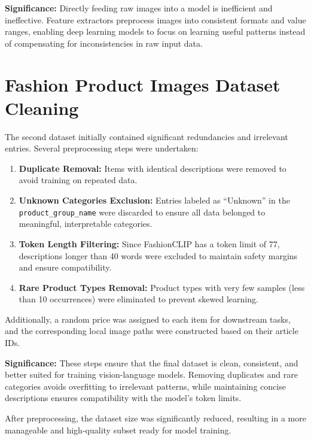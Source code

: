 \textbf{Significance:} Directly feeding raw images into a model is inefficient and ineffective. Feature extractors preprocess images into consistent formats and value ranges, enabling deep learning models to focus on learning useful patterns instead of compensating for inconsistencies in raw input data.

\section{Fashion Product Images Dataset Cleaning}

The second dataset initially contained significant redundancies and irrelevant entries. Several preprocessing steps were undertaken:

\vspace{-1.25em}
\begin{enumerate}
    \setlength\itemsep{-1.05em}
    \item \textbf{Duplicate Removal:} Items with identical descriptions were removed to avoid training on repeated data.
    \item \textbf{Unknown Categories Exclusion:} Entries labeled as ``Unknown'' in the \texttt{product\_group\_name} were discarded to ensure all data belonged to meaningful, interpretable categories.
    \item \textbf{Token Length Filtering:} Since FashionCLIP has a token limit of 77, descriptions longer than 40 words were excluded to maintain safety margins and ensure compatibility.
    \item \textbf{Rare Product Types Removal:} Product types with very few samples (less than 10 occurrences) were eliminated to prevent skewed learning.
\end{enumerate}

Additionally, a random price was assigned to each item for downstream tasks, and the corresponding local image paths were constructed based on their article IDs.

\textbf{Significance:} These steps ensure that the final dataset is clean, consistent, and better suited for training vision-language models. Removing duplicates and rare categories avoids overfitting to irrelevant patterns, while maintaining concise descriptions ensures compatibility with the model's token limits.

After preprocessing, the dataset size was significantly reduced, resulting in a more manageable and high-quality subset ready for model training.
